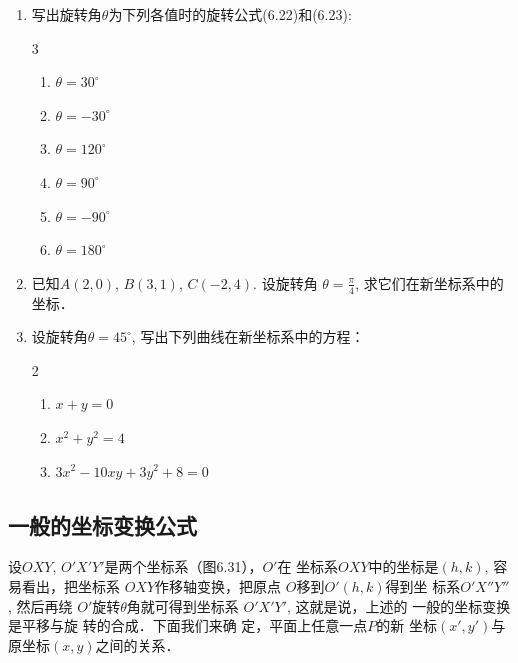 \begin{ex}
\begin{enumerate}
    \item 写出旋转角$\theta$为下列各值时的旋转公式(6.22)和(6.23): 
\begin{multicols}{3}
\begin{enumerate}
    \item $\theta=30^{\circ}$
    \item $\theta=-30^{\circ}$
    \item $\theta = 120^{\circ}$
    \item $\theta = 90^{\circ}$
    \item $\theta = -90^{\circ}$
    \item $\theta = 180^{\circ}$
\end{enumerate}
\end{multicols}

    \item 已知$A(2,0)$, $B(3,1)$, $C(-2,4)$. 设旋转角
    $\theta = \frac{\pi}{4}$, 
    求它们在新坐标系中的坐标．
    \item 设旋转角$\theta=45^{\circ}$, 写出下列曲线在新坐标系中的方程：
    \begin{multicols}{2}
        \begin{enumerate}
    \item $x+y=0$
\item  $x^2+y^2=4$
\item $3x^2-10xy+3y^2+8=0$
\end{enumerate}
\end{multicols}
\end{enumerate}
\end{ex}

\subsection{一般的坐标变换公式}
设$OXY$, $O'X'Y'$是两个坐标系（图6.31），$O'$在
坐标系$OXY$中的坐标是$(h,k)$, 容易看出，把坐标系
$OXY$作移轴变换，把原点
$O$移到$O'(h,k)$得到坐
标系$O'X''Y''$, 然后再绕
$O'$旋转$\theta$角就可得到坐标系
$O'X'Y'$, 这就是说，上述的
一般的坐标变换是平移与旋
转的合成．下面我们来确
定，平面上任意一点$P$的新
坐标$(x',y')$与原坐标$(x,y)$之间的关系．

\begin{figure}[htp]
    \centering
{}

    \caption{}
\end{figure}



